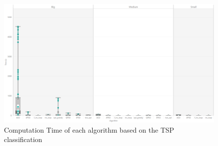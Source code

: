 \documentclass[conference]{IEEEtran}
\begin{document}
	
	


\clearpage
\appendix

    \begin{figure}[h]
    		\centering
    		\includegraphics[width=\textwidth]{boxplot_time_nodesize.png}
    		\caption{Computation Time of each algorithm based on the TSP classification}
    		\label{fig:boxPlotTime}
    \end{figure}
	    
\end{document}
